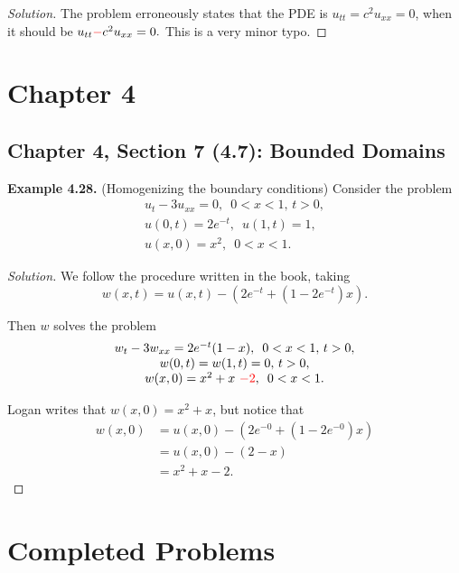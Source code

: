 \documentclass[11pt]{article}
\newenvironment{solution}
  {\renewcommand\qedsymbol{$\blacksquare$}\begin{proof}[Solution]}
  {\end{proof}}
\theoremstyle{definition}
\begin{document}
\begin{solution}
  The problem erroneously states that the PDE is $u_{tt} = c^2u_{xx} = 0$, when it should be $u_{tt} \textcolor{red}{-}c ^2u_{xx} = 0.$ This is a very minor typo.
\end{solution}

\newpage

\setcounter{section}{3}
\section{Chapter 4}

\setcounter{subsection}{6}

\subsection{Chapter 4, Section 7 (4.7): Bounded Domains}
\textbf{Example 4.28.} (Homogenizing the boundary conditions) Consider the problem
\[
\begin{array}{c}
u_{t} - 3u_{xx} = 0, \, \, \, 0 < x < 1, \, t > 0,\\
u(0, t) = 2e^{-t}, \, \, \, u(1, t) = 1,\\
u(x, 0) = x^2, \,\,\, 0 < x < 1.
\end{array}
\]

\begin{solution}
We follow the procedure written in the book, taking 
\[ w(x, t) = u(x, t) - \left(2e^{-t} + \left(1-2e^{-t}\right)x\right).\]

Then $w$ solves the problem
\[
\begin{array}{c}
w_{t} - 3w_{xx} = 2e^{-t}(1-x), \, \, \, 0 < x < 1, \, t > 0,\\
w(0, t) = w(1, t) = 0, \, t > 0,\\
w(x, 0) = x^2 + x \text{ } \textcolor{red}{- 2}, \,\,\, 0 < x < 1.
\end{array}
\]

Logan writes that $w(x, 0) = x^2 + x$, but notice that
\begin{align*}
  w(x, 0) &= u(x, 0) - \left(2e^{-0} + \left(1-2e^{-0}\right)x\right) \\
  &= u(x, 0) - (2 - x) \\
  &= x^2 + x - 2.
\end{align*}

\end{solution}
\appendix

\newpage

\section{Completed Problems}
\end{document}
